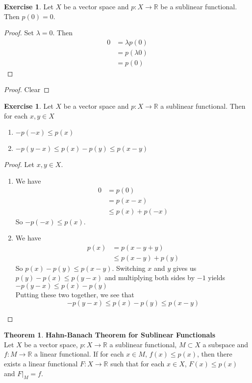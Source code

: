 \documentclass[12pt]{amsart}
\theoremstyle{definition}
\newtheorem{thm}[definition]{Theorem}
\newtheorem{ex}[definition]{Exercise}
\newcommand{\lam}{\lambda}
\newcommand{\R}{\mathbb{R}}
\newcommand{\tbf}[1]{\textbf{#1}}
\DeclareMathOperator*{\0}{\mbf{0}}
\DeclareMathOperator*{\1}{\mbf{1}}
\newcommand{\lex}[1]{\label{ex:#1}}
\begin{document}
	\begin{ex} \lex{55004}
		Let $X$ be a vector space and $p: X \rightarrow \R$ be a sublinear functional. Then $p(0) = 0$.
	\end{ex}
	
	\begin{proof} Set $\lam = 0$. Then 
		\begin{align*}
			0
			&= \lam p(0) \\
			&= p(\lam 0) \\
			&= p(0)
		\end{align*}
	\end{proof}
	
	\begin{proof}
		Clear
	\end{proof}
	
	\begin{ex} \lex{55008}
		Let $X$ be a vector space and $p:X \rightarrow \R$ a sublinear functional. Then for each $x, y \in X$
		\begin{enumerate}
			\item $-p(-x) \leq p(x)$
			\item $- p(y-x) \leq p(x) - p(y) \leq p(x-y)$
		\end{enumerate}
	\end{ex}
	
	\begin{proof}
		Let $x, y \in X$.
		\begin{enumerate}
			\item We have
			\begin{align*}
				0
				&= p(0) \\ 
				&= p(x - x) \\
				& \leq p(x) + p(-x)
			\end{align*}
			So $-p(-x) \leq p(x)$.
			\item We have
			\begin{align*}
				p(x)
				&= p(x -y + y) \\
				& \leq p(x-y) + p(y)
			\end{align*}
			So $p(x) - p(y) \leq p(x-y)$. Switching $x$ and $y$ gives us $p(y) - p(x) \leq p(y-x)$ and multiplying both sides by $-1$ yields $-p(y-x) \leq p(x) - p(y)$ \\ 
			Putting these two together, we see that $$-p(y-x) \leq p(x) - p(y) \leq p(x-y)$$
		\end{enumerate}
	\end{proof}
	
	
	
	\begin{thm}\tbf{Hahn-Banach Theorem for Sublinear Functionals}\\
		Let $X$ be a vector space, $p:X \rightarrow \R$ a sublinear functional, $M \subset X$ a subspace and $f:M \rightarrow \R$ a linear functional. If for each $x \in M$, $ f(x)  \leq p(x)$, then there exists a linear functional $F:X \rightarrow \R$ such that for each $x \in X$, $F(x) \leq p(x)$ and $F|_{M}=f$.
	\end{thm}
	
\end{document}
